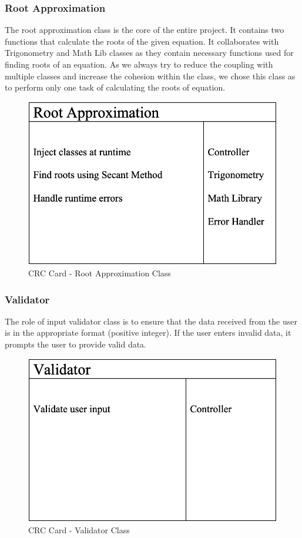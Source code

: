     \subsubsection{Root Approximation}
      \parbox{1.0\linewidth}{
        The root approximation class is the core of the entire project. It contains two functions that calculate the roots of the given equation. It collaborates with Trigonometry and Math Lib classes as they contain necessary functions used for finding roots of an equation. As we always try to reduce the coupling with multiple classes and increase the cohesion within the class, we chose this class as to perform only one task of calculating the roots of equation.
      }
      \vspace*{2em}
      \begin{figure}[h!]
        \centering
        \includegraphics[width=.5\linewidth]{resources/RootApproximation.png}
        \caption{CRC Card - Root Approximation Class}\label{fig:rootapprox}
      \end{figure} 

    \subsubsection{Validator}
      \parbox{1.0\linewidth}{
        The role of input validator class is to ensure that the data received from the user is in the appropriate format (positive integer). If the user enters invalid data, it prompts the user to provide valid data.
      }
      \vspace*{2em}
      \begin{figure}[h!]
        \centering
        \includegraphics[width=.5\linewidth]{resources/Validator.png}
        \caption{CRC Card - Validator Class}\label{fig:validator}
      \end{figure}  

